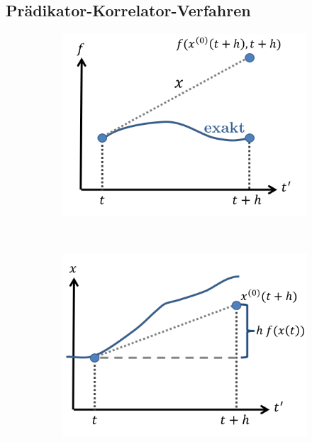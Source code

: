 \documentclass[12pt]{article}
\begin{document}
\subsection{Prädikator-Korrelator-Verfahren}

\begin{figure}[h] 
		\begin{subfigure}[h]{0.5 \textwidth}
		\centering
		\includegraphics[width=\textwidth]{Folie62.png}
		\centering
	\end{subfigure}
	~
\begin{subfigure}[h]{0.5\textwidth}
		\centering
		\includegraphics[width=\textwidth]{Folie63.png}
		\centering
	\end{subfigure}
	\caption{} \label{Praedikator}
\end{figure}	
\end{document}
